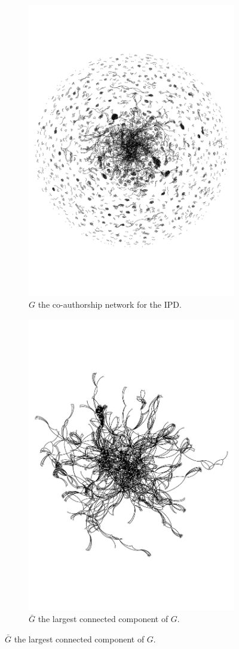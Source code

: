 \documentclass{article}
\theoremstyle{definition}
\begin{document}
\begin{figure}[!hbtp]
    \begin{subfigure}{.45\textwidth}\centering
        \includegraphics[width=.7\textwidth]{./assets/images/pd_network.pdf}
        \caption{\(G\) the co-authorship network for the IPD.}\label{fig:g_one_network}
    \end{subfigure}\hfill
    \begin{subfigure}{.45\textwidth}\centering
        \includegraphics[width=.7\textwidth]{./assets/images/pd_network_cluster.pdf}
        \caption{\(\bar{G}\) the largest connected component of \(G\).}\label{fig:g_one_cluster}
     \end{subfigure}
\end{figure}
\end{document}
